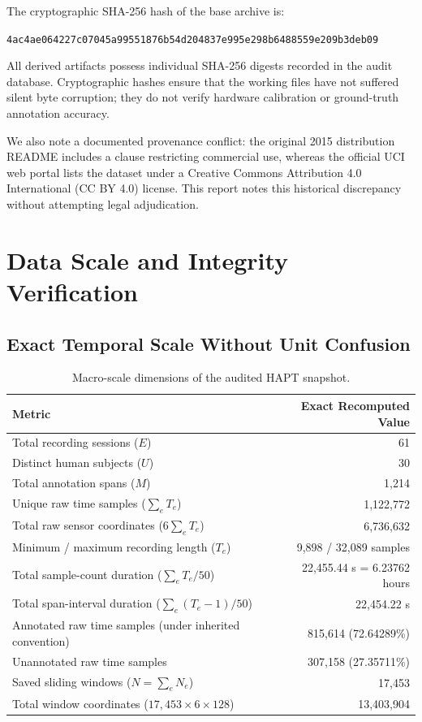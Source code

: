 \documentclass[11pt,a4paper]{article}
\newcommand{\code}[1]{{\small\ttfamily\nolinkurl{#1}}}
\theoremstyle{definition}
\begin{document}
The cryptographic SHA-256 hash of the base archive is:
\begin{center}
\code{4ac4ae064227c07045a99551876b54d204837e995e298b6488559e209b3deb09}
\end{center}
All derived artifacts possess individual SHA-256 digests recorded in the audit database. Cryptographic hashes ensure that the working files have not suffered silent byte corruption; they do not verify hardware calibration or ground-truth annotation accuracy.

We also note a documented provenance conflict: the original 2015 distribution README includes a clause restricting commercial use, whereas the official UCI web portal lists the dataset under a Creative Commons Attribution 4.0 International (CC BY 4.0) license. This report notes this historical discrepancy without attempting legal adjudication.

\section{Data Scale and Integrity Verification}

\subsection{Exact Temporal Scale Without Unit Confusion}
\begin{table}[htbp]\centering\small
\begin{tabular}{@{}lr@{}}\toprule
Metric & Exact Recomputed Value\\\midrule
Total recording sessions ($E$) & 61\\
Distinct human subjects ($U$) & 30\\
Total annotation spans ($M$) & 1,214\\
Unique raw time samples ($\sum_e T_e$) & 1,122,772\\
Total raw sensor coordinates ($6 \sum_e T_e$) & 6,736,632\\
Minimum / maximum recording length ($T_e$) & 9,898 / 32,089 samples\\
Total sample-count duration ($\sum_e T_e / 50$) & 22,455.44 s = 6.23762 hours\\
Total span-interval duration ($\sum_e (T_e - 1) / 50$) & 22,454.22 s\\
Annotated raw time samples (under inherited convention) & 815,614 (72.64289\%)\\
Unannotated raw time samples & 307,158 (27.35711\%)\\
Saved sliding windows ($N = \sum_e N_e$) & 17,453\\
Total window coordinates ($17,453 \times 6 \times 128$) & 13,403,904\\\bottomrule
\end{tabular}
\caption{Macro-scale dimensions of the audited HAPT snapshot.}
\end{table}
\end{document}
